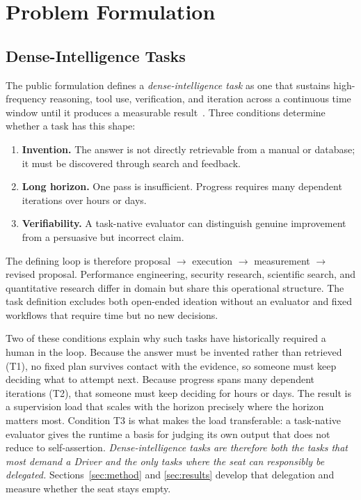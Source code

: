 \section{Problem Formulation}
\label{sec:problem}

\subsection{Dense-Intelligence Tasks}

The public \systemname formulation defines a \emph{dense-intelligence task} as one that
sustains high-frequency reasoning, tool use, verification, and iteration across a
continuous time window until it produces a measurable result~\citep{argus_site}.
Three conditions determine whether a task has this shape:

\begin{enumerate}[label=\textbf{T\arabic*.}]
  \item \textbf{Invention.} The answer is not directly retrievable from a manual or
    database; it must be discovered through search and feedback.
  \item \textbf{Long horizon.} One pass is insufficient. Progress requires many
    dependent iterations over hours or days.
  \item \textbf{Verifiability.} A task-native evaluator can distinguish genuine
    improvement from a persuasive but incorrect claim.
\end{enumerate}

The defining loop is therefore proposal $\rightarrow$ execution $\rightarrow$
measurement $\rightarrow$ revised proposal. Performance engineering, security
research, scientific search, and quantitative research differ in domain but share
this operational structure. The task definition excludes both open-ended ideation
without an evaluator and fixed workflows that require time but no new decisions.

Two of these conditions explain why such tasks have historically required a human in
the loop. Because the answer must be invented rather than retrieved (T1), no fixed
plan survives contact with the evidence, so someone must keep deciding what to
attempt next. Because progress spans many dependent iterations (T2), that someone
must keep deciding for hours or days. The result is a supervision load that scales
with the horizon precisely where the horizon matters most. Condition T3 is what makes
the load transferable: a task-native evaluator gives the runtime a basis for judging
its own output that does not reduce to self-assertion. \emph{Dense-intelligence tasks
are therefore both the tasks that most demand a Driver and the only tasks where the
seat can responsibly be delegated.} Sections~\ref{sec:method} and \ref{sec:results}
develop that delegation and measure whether the seat stays empty.

